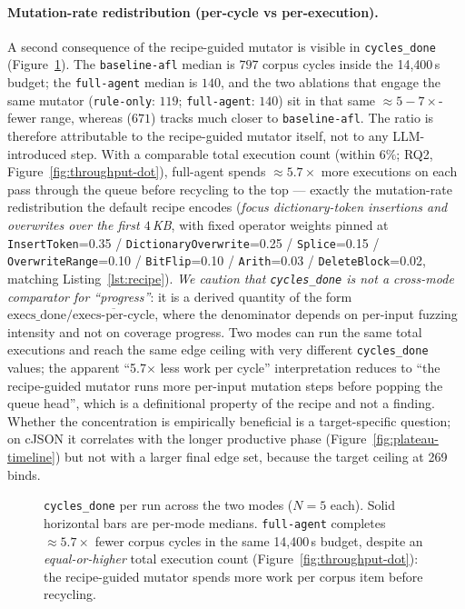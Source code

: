 \documentclass[11pt]{article}
\begin{document}
\paragraph{Mutation-rate redistribution (per-cycle vs per-execution).}
A second consequence of the recipe-guided mutator is visible in
\texttt{cycles\_done} (Figure~\ref{fig:cycles}). The
\texttt{baseline-afl} median is $797$ corpus cycles inside the
14{,}400\,s budget; the \texttt{full-agent} median is $140$, and
the two ablations that engage the same mutator
(\texttt{rule-only}: $119$; \texttt{full-agent}: $140$) sit in
that same $\approx 5\!-\!7\times$-fewer range, whereas
 ($671$) tracks much closer to
\texttt{baseline-afl}. The ratio is therefore attributable to the
recipe-guided mutator itself, not to any LLM-introduced step.
With a comparable total execution count (within $6\%$; RQ2,
Figure~\ref{fig:throughput-dot}), full-agent spends $\approx 5.7\times$
more executions on each pass through the queue before recycling to
the top --- exactly the mutation-rate redistribution the default
recipe encodes (\emph{focus dictionary-token insertions and overwrites
over the first $4\,$KB}, with fixed operator weights pinned at
\texttt{InsertToken}=0.35 / \texttt{DictionaryOverwrite}=0.25 /
\texttt{Splice}=0.15 / \texttt{OverwriteRange}=0.10 /
\texttt{BitFlip}=0.10 / \texttt{Arith}=0.03 /
\texttt{DeleteBlock}=0.02, matching Listing~\ref{lst:recipe}).
\emph{We caution that \texttt{cycles\_done} is not a cross-mode
comparator for ``progress''}: it is a derived quantity of the
form $\text{execs\_done} / \overline{\text{execs-per-cycle}}$,
where the denominator depends on per-input fuzzing intensity and
not on coverage progress. Two modes can run the same total
executions and reach the same edge ceiling with very different
\texttt{cycles\_done} values; the apparent ``5.7$\times$ less
work per cycle'' interpretation reduces to ``the recipe-guided
mutator runs more per-input mutation steps before popping the
queue head'', which is a definitional property of the recipe and
not a finding. Whether the concentration is empirically
beneficial is a target-specific question; on cJSON it correlates
with the longer productive phase
(Figure~\ref{fig:plateau-timeline}) but not with a larger final
edge set, because the target ceiling at 269 binds.

\begin{figure}[t]
  \centering
  
  \caption{\texttt{cycles\_done} per run across the two modes
  ($N{=}5$ each). Solid horizontal bars are per-mode medians.
  \texttt{full-agent} completes
  $\approx 5.7\times$ fewer corpus cycles in the same 14{,}400\,s
  budget, despite an \emph{equal-or-higher} total execution count
  (Figure~\ref{fig:throughput-dot}): the recipe-guided mutator
  spends more work per corpus item before recycling.}
  \label{fig:cycles}
\end{figure}
\end{document}
